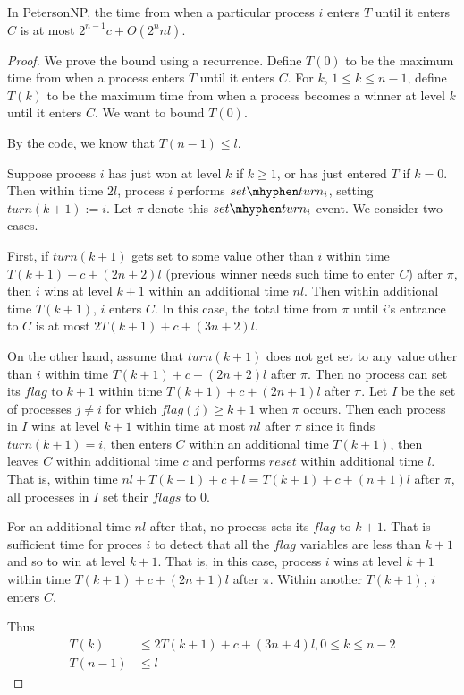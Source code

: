 \documentclass[11pt]{article}
\def \setturn {set\mhyphen turn}
\begin{document}
\begin{theorem}[]
In PetersonNP, the time from when a particular process \(i\) enters \(T\) until it enters \(C\) is at
most \(2^{n-1}c+O(2^nnl)\).
\end{theorem}

\begin{proof}
We prove the bound using a recurrence. Define \(T(0)\) to be the maximum time from when a process
enters \(T\) until it enters \(C\). For \(k\), \(1\le k\le n-1\), define \(T(k)\) to be the maximum
time from when a process becomes a winner at level \(k\) until it enters \(C\). We want to bound
\(T(0)\).

By the code, we know that \(T(n-1)\le l\).

Suppose process \(i\) has just won at level \(k\) if \(k\ge 1\), or has just entered \(T\) if \(k=0\).
Then within time \(2l\), process \(i\) performs \(\setturn_i\), setting \(turn(k+1):=i\). Let \(\pi\)
denote this \(\setturn_i\) event. We consider two cases.

First, if \(turn(k+1)\) gets set to some value other than \(i\) within time \(T(k+1)+c+(2n+2)l\)
(previous winner needs such time to enter \(C\)) after
\(\pi\), then \(i\) wins at level \(k+1\) within an additional time \(nl\). Then within additional
time \(T(k+1)\), \(i\) enters \(C\). In this case, the total time from \(\pi\) until \(i\)'s entrance
to \(C\) is at most \(2T(k+1)+c+(3n+2)l\).

On the other hand, assume that \(turn(k+1)\) does not get set to any value other than \(i\) within
time \(T(k+1)+c+(2n+2)l\) after \(\pi\). Then no process can set its \(flag\) to \(k+1\) within time
\(T(k+1)+c+(2n+1)l\) after \(\pi\). Let \(I\) be the set of processes \(j\neq i\) for which
\(flag(j)\ge k+1\) when \(\pi\) occurs. Then each process in \(I\) wins at level \(k+1\) within time
at most \(nl\) after \(\pi\) since it finds \(turn(k+1)=i\), then enters \(C\) within an additional
time \(T(k+1)\), then leaves \(C\) within additional time \(c\) and performs \(reset\) within
additional time \(l\). That is, within time \(nl+T(k+1)+c+l=T(k+1)+c+(n+1)l\) after \(\pi\), all
processes in \(I\) set their \(flags\) to 0.

For an additional time \(nl\) after that, no process sets its \(flag\) to \(k+1\). That is sufficient
time for proces \(i\) to detect that all the \(flag\) variables are less than \(k+1\) and so to win at
level \(k+1\). That is, in this case, process \(i\) wins at level \(k+1\) within time
\(T(k+1)+c+(2n+1)l\) after \(\pi\). Within another \(T(k+1)\), \(i\) enters \(C\).

Thus
\begin{align*}
T(k)&\le 2T(k+1)+c+(3n+4)l,0\le k\le n-2\\
T(n-1)&\le l
\end{align*}
\end{proof}
\end{document}
